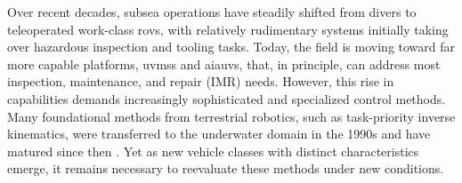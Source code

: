 \documentclass[../main.tex]{subfiles}
\begin{document}

Over recent decades, subsea operations have steadily shifted from divers to teleoperated work-class \glspl{rov}, with relatively rudimentary systems initially taking over hazardous inspection and tooling tasks. Today, the field is moving toward far more capable platforms, \glspl{uvms} and \glspl{aiauv}, that, in principle, can address most inspection, maintenance, and repair (IMR) needs. However, this rise in capabilities demands increasingly sophisticated and specialized control methods. Many foundational methods from terrestrial robotics, such as task-priority inverse kinematics, were transferred to the underwater domain in the 1990s and have matured since then \cite{antonelli1998, simetti2018a}. Yet as new vehicle classes with distinct characteristics emerge, it remains necessary to reevaluate these methods under new conditions.
\end{document}
